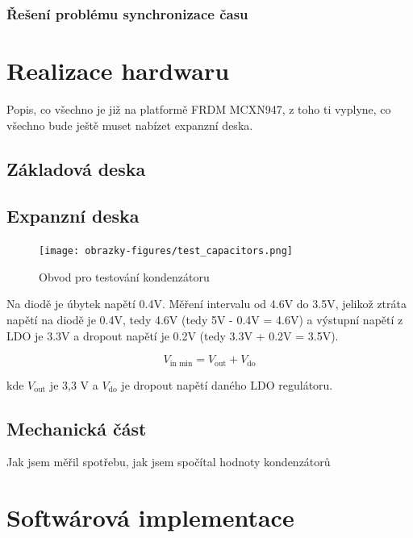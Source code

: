 
\subsection{Řešení problému synchronizace času}


\chapter{Realizace hardwaru}
\label{realizace_hardwaru}
Popis, co všechno je již na platformě FRDM MCXN947, z toho ti vyplyne, co všechno bude ještě muset nabízet expanzní deska.
\section{Základová deska}

\section{Expanzní deska}

\begin{figure}[h]
    \centering
    \texttt{[image: obrazky-figures/test\_capacitors.png]}
    
    \caption{Obvod pro testování kondenzátoru}
    \label{fig:test-capacitors}
\end{figure}

Na diodě je úbytek napětí 0.4V. Měření intervalu od 4.6V do 3.5V, jelikož ztráta napětí na diodě je 0.4V, tedy 4.6V (tedy 5V - 0.4V = 4.6V) a výstupní napětí z LDO je 3.3V a dropout napětí je 0.2V (tedy 3.3V + 0.2V = 3.5V).

\[
V_{\text{in min}} = V_{\text{out}} + V_{\text{do}}
\]

kde \(V_{\text{out}}\) je 3,3 V a \(V_{\text{do}}\) je dropout napětí daného LDO regulátoru.


\section{Mechanická část}
Jak jsem měřil spotřebu, jak jsem spočítal hodnoty kondenzátorů

\chapter{Softwárová implementace}

